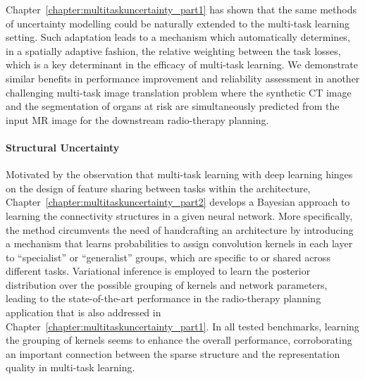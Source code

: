Chapter~\ref{chapter:multitaskuncertainty_part1} has shown that the same methods of uncertainty modelling could be naturally extended to the multi-task learning setting. Such adaptation leads to a mechanism which automatically determines, in a spatially adaptive fashion, the relative weighting between the task losses, which is a key determinant in the efficacy of multi-task learning. We demonstrate similar benefits in performance improvement and reliability assessment in another challenging multi-task image translation problem where the synthetic CT image and the segmentation of organs at risk are simultaneously predicted from the input MR image for the downstream radio-therapy planning. 

\paragraph{Structural Uncertainty}
Motivated by the observation that multi-task learning with deep learning hinges on the design of feature sharing between tasks within the architecture, Chapter~\ref{chapter:multitaskuncertainty_part2} develops a Bayesian approach to learning the connectivity structures in a given neural network. More specifically, the method circumvents the need of handcrafting an architecture by introducing a mechanism that learns probabilities to assign convolution kernels in each layer to ``specialist'' or ``generalist'' groups, which are specific to or shared across different tasks. Variational inference is employed to learn the posterior distribution over the possible grouping of kernels and network parameters, leading to the state-of-the-art performance in the radio-therapy planning application that is also addressed in Chapter~\ref{chapter:multitaskuncertainty_part1}. In all tested benchmarks, learning the grouping of kernels seems to enhance the overall performance, corroborating an important connection between the sparse structure and the representation quality in multi-task learning. 

